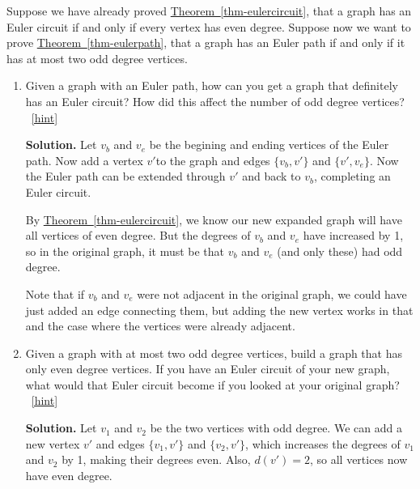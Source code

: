\documentclass{book}
\begin{document}
\setcounter{project}{15}
\addtocounter{project}{-1}
\begin{activity}[]\label{activity-10}
\hypertarget{p-180}{}%
Suppose we have already proved \hyperref[thm-eulercircuit]{Theorem~\ref{thm-eulercircuit}}, that a graph has an Euler circuit if and only if every vertex has even degree.  Suppose now we want to prove \hyperref[thm-eulerpath]{Theorem~\ref{thm-eulerpath}}, that a graph has an Euler path if and only if it has at most two odd degree vertices.%
\begin{enumerate}[font=\bfseries,label=(\alph*),ref=\alph*]
\item\label{task-13} \hypertarget{p-181}{}%
Given a graph with an Euler path, how can you get a graph that definitely has an Euler circuit?  How did this affect the number of odd degree vertices?%
~\hfill{\tiny\hyperlink{a-15.a}{[hint]}\hypertarget{q-15.a}{}}\par\smallskip%
\noindent\textbf{Solution.}\hypertarget{solution-9}{}\quad%
\hypertarget{p-183}{}%
Let \(v_b\) and \(v_e\) be the begining and ending vertices of the Euler path.  Now add a vertex \(v'\)to the graph and edges \(\{v_b, v'\}\) and \(\{v', v_e\}\).  Now the Euler path can be extended through \(v'\) and back to \(v_b\), completing an Euler circuit.%
\par
\hypertarget{p-184}{}%
By \hyperref[thm-eulercircuit]{Theorem~\ref{thm-eulercircuit}}, we know our new expanded graph will have all vertices of even degree.  But the degrees of \(v_b\) and \(v_e\) have increased by 1, so in the original graph, it must be that \(v_b\) and \(v_e\) (and only these) had odd degree.%
\par
\hypertarget{p-185}{}%
Note that if \(v_b\) and \(v_e\) were not adjacent in the original graph, we could have just added an edge connecting them, but adding the new vertex works in that and the case where the vertices were already adjacent.%
\item\label{task-14} \hypertarget{p-186}{}%
Given a graph with at most two odd degree vertices, build a graph that has only even degree vertices.  If you have an Euler circuit of your new graph, what would that Euler circuit become if you looked at your original graph?%
~\hfill{\tiny\hyperlink{a-15.b}{[hint]}\hypertarget{q-15.b}{}}\par\smallskip%
\noindent\textbf{Solution.}\hypertarget{solution-10}{}\quad%
\hypertarget{p-188}{}%
Let \(v_1\) and \(v_2\) be the two vertices with odd degree.  We can add a new vertex \(v'\) and edges \(\{v_1, v'\}\) and \(\{v_2, v'\}\), which increases the degrees of \(v_1\) and \(v_2\) by 1, making their degrees even.  Also, \(d(v') = 2\), so all vertices now have even degree.%

\end{enumerate}
\end{activity}
\end{document}
